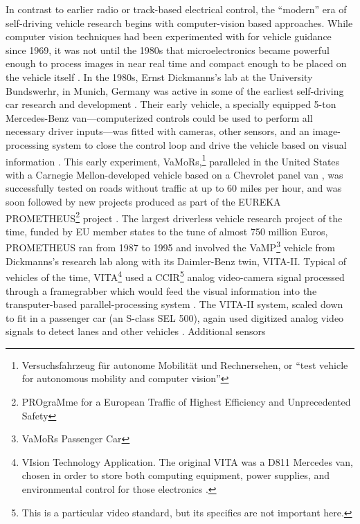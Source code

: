 
In contrast to earlier radio or track-based electrical control, the
``modern'' era of self-driving vehicle research begins with
computer-vision based approaches. While computer vision techniques had
been experimented with for vehicle guidance since 1969, it was not
until the 1980s that microelectronics became powerful enough to
process images in near real time and compact enough to be placed on
the vehicle itself \cite[p. v]{dickmannsDynamic}. In the 1980s, Ernst
Dickmanns's lab at the 
University Bundswerhr, in Munich, Germany was active in some of the
earliest self-driving car research and development \cite{schmidhuber}. Their early
vehicle, a specially equipped 5-ton Mercedes-Benz van---computerized
controls could be used to perform all necessary driver inputs---was
fitted with cameras, other sensors, and an image-processing system to
close the control loop and drive the vehicle based on visual
information \cite{vamors-p}. This early experiment,
VaMoRs,\footnote{Versuchsfahrzeug f\"{u}r autonome Mobilit\"{a}t und
  Rechnersehen, or ``test vehicle for autonomous mobility and computer
  vision''} paralleled in the United  
States with a Carnegie Mellon-developed vehicle based on a Chevrolet
panel van \cite{bogostHist}, was successfully tested on roads without
traffic at up to 
60 miles per hour, and was soon followed by new projects produced as
part of the EUREKA PROMETHEUS\footnote{PROgraMme for a European
  Traffic of Highest Efficiency and Unprecedented Safety} project \cite{eureka}. The largest driverless vehicle
research project of the time, funded by EU member states to the tune
of almost 750 million Euros, PROMETHEUS ran from 1987 to 1995 and
involved the VaMP\footnote{VaMoRs Passenger Car} vehicle from
Dickmanns's research lab along with its 
Daimler-Benz twin, VITA-II. Typical of vehicles of the time,
VITA\footnote{VIsion Technology Application. The original VITA was a
  D811 Mercedes van, chosen in order to store both computing
  equipment, power supplies, and environmental control for those
  electronics \cite[p. 37]{ulmerVITA}.} used
a CCIR\footnote{This is a particular video standard, but its specifics are
  not important here.} analog video-camera signal processed through a framegrabber
which would feed the visual information into the transputer-based
parallel-processing system \cite[p. 38]{ulmerVITA}. The VITA-II
system, scaled down to fit in 
a passenger car (an S-class SEL 500), again used digitized analog
video signals to detect lanes and other vehicles \cite[p.
  2]{ulmerVITA-II}. Additional sensors 
